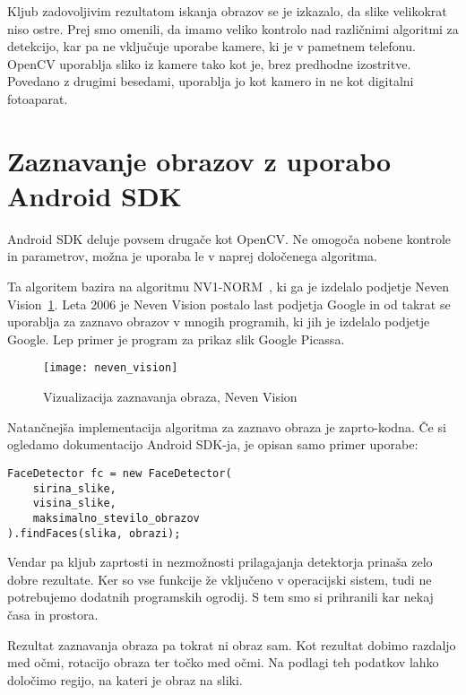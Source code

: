 Kljub zadovoljivim rezultatom iskanja obrazov se je izkazalo, da slike
velikokrat niso ostre. Prej smo omenili, da imamo veliko kontrolo nad
različnimi algoritmi za detekcijo, kar pa ne vključuje uporabe kamere, ki je v
pametnem telefonu. OpenCV uporablja sliko iz kamere tako kot je, brez
predhodne izostritve. Povedano z drugimi besedami, uporablja jo kot kamero in
ne kot digitalni fotoaparat.


\section{Zaznavanje obrazov z uporabo Android SDK}
\label{sec:zaznavanjeObrazovAndroidSDK}
Android SDK deluje povsem drugače kot OpenCV. Ne omogoča nobene kontrole in
parametrov, možna je uporaba le v naprej določenega algoritma.

Ta algoritem bazira na algoritmu NV1-NORM~\cite{nevenFaceRecognition}, ki ga
je izdelalo podjetje Neven Vision~\ref{fig:neven_vision}. Leta 2006 je Neven
Vision postalo last podjetja Google in od takrat se uporablja za zaznavo
obrazov v mnogih programih, ki jih je izdelalo podjetje Google. Lep  primer je
program za prikaz slik Google Picassa.

\begin{figure}[!ht]
    \centering
    \texttt{[image: neven\_vision]}
    \caption{Vizualizacija zaznavanja obraza, Neven Vision}
    \label{fig:neven_vision}
\end{figure}

Natančnejša implementacija algoritma za zaznavo obraza je zaprto-kodna. Če si
ogledamo dokumentacijo Android SDK-ja, je opisan samo primer uporabe:
\pagebreak %
\begin{lstlisting}[caption="Primer uporabe zaznavanja obraza z orodjem Android SDK"]
FaceDetector fc = new FaceDetector(
    sirina_slike,
    visina_slike,
    maksimalno_stevilo_obrazov
).findFaces(slika, obrazi);
\end{lstlisting}

Vendar pa kljub zaprtosti in nezmožnosti prilagajanja detektorja prinaša zelo
dobre rezultate. Ker so vse funkcije že vključeno v operacijski sistem, tudi
ne potrebujemo dodatnih programskih ogrodij. S tem smo si prihranili kar nekaj
časa in prostora.

Rezultat zaznavanja obraza pa tokrat ni obraz sam. Kot rezultat dobimo
razdaljo med očmi, rotacijo obraza ter točko med očmi. Na podlagi teh podatkov
lahko določimo regijo, na kateri je obraz na sliki.

